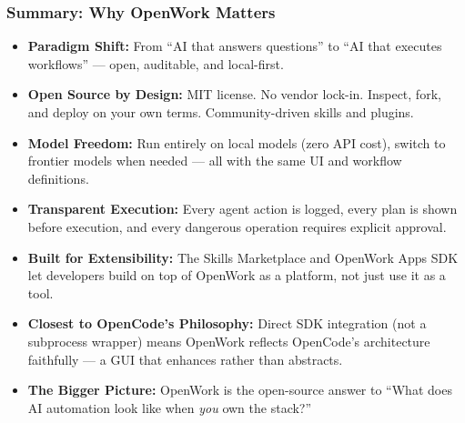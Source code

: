 \begin{frame}[fragile]\frametitle{Summary: Why OpenWork Matters}
  \begin{itemize}
    \item \textbf{Paradigm Shift:} From ``AI that answers questions'' to ``AI that executes workflows'' — open, auditable, and local-first.
    \item \textbf{Open Source by Design:} MIT license. No vendor lock-in. Inspect, fork, and deploy on your own terms. Community-driven skills and plugins.
    \item \textbf{Model Freedom:} Run entirely on local models (zero API cost), switch to frontier models when needed — all with the same UI and workflow definitions.
    \item \textbf{Transparent Execution:} Every agent action is logged, every plan is shown before execution, and every dangerous operation requires explicit approval.
    \item \textbf{Built for Extensibility:} The Skills Marketplace and OpenWork Apps SDK let developers build on top of OpenWork as a platform, not just use it as a tool.
    \item \textbf{Closest to OpenCode's Philosophy:} Direct SDK integration (not a subprocess wrapper) means OpenWork reflects OpenCode's architecture faithfully — a GUI that enhances rather than abstracts.
    \item \textbf{The Bigger Picture:} OpenWork is the open-source answer to ``What does AI automation look like when \textit{you} own the stack?''
  \end{itemize}
\end{frame}

